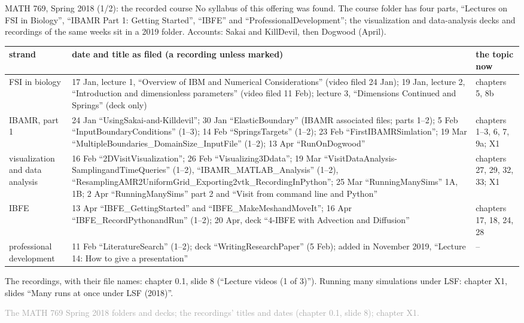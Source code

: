 \documentclass[aspectratio=169,11pt]{beamer}
\newcommand{\sourcecredit}[1]{\vfill\begin{flushright}\tiny\textcolor{DarkGray}{#1}\end{flushright}}
\begin{document}
\begin{frame}{MATH 769, Spring 2018 (1/2): the recorded course}
\label{fr:m769e}
\footnotesize No syllabus of this offering was found. The course folder has four parts, ``Lectures on FSI in Biology'', ``IBAMR Part 1: Getting Started'', ``IBFE'' and ``ProfessionalDevelopment''; the visualization and data-analysis decks and recordings of the same weeks sit in a 2019 folder. Accounts: Sakai and KillDevil, then Dogwood (April).

\vspace{1mm}
\tiny
\renewcommand{\arraystretch}{1.12}
\setlength{\tabcolsep}{3pt}
\begin{tabular}{@{}L{0.14\textwidth}L{0.66\textwidth}L{0.15\textwidth}@{}}
\toprule
strand & date and title as filed (a recording unless marked) & the topic now \\
\midrule
FSI in biology & 17 Jan, lecture 1, ``Overview of IBM and Numerical Considerations'' (video filed 24 Jan); 19 Jan, lecture 2, ``Introduction and dimensionless parameters'' (video filed 11 Feb); lecture 3, ``Dimensions Continued and Springs'' (deck only) & chapters 5, 8b \\
IBAMR, part 1 & 24 Jan ``UsingSakai-and-Killdevil''; 30 Jan ``ElasticBoundary'' (IBAMR associated files; parts 1--2); 5 Feb ``InputBoundaryConditions'' (1--3); 14 Feb ``SpringsTargets'' (1--2); 23 Feb ``FirstIBAMRSimlation''; 19 Mar ``MultipleBoundaries\_\allowbreak DomainSize\_\allowbreak InputFile'' (1--2); 13 Apr ``RunOnDogwood'' & chapters 1--3, 6, 7, 9a; X1 \\
visualization and data analysis & 16 Feb ``2DVisitVisualization''; 26 Feb ``Visualizing3Ddata''; 19 Mar ``VisitDataAnalysis-\allowbreak SamplingandTimeQueries'' (1--2), ``IBAMR\_\allowbreak MATLAB\_\allowbreak Analysis'' (1--2), ``ResamplingAMR2UniformGrid\_\allowbreak Exporting2vtk\_\allowbreak RecordingInPython''; 25 Mar ``RunningManySims'' 1A, 1B; 2 Apr ``RunningManySims'' part 2 and ``Visit from command line and Python'' & chapters 27, 29, 32, 33; X1 \\
IBFE & 13 Apr ``IBFE\_\allowbreak GettingStarted'' and ``IBFE\_\allowbreak MakeMeshandMoveIt''; 16 Apr ``IBFE\_\allowbreak RecordPythonandRun'' (1--2); 20 Apr, deck ``4-IBFE with Advection and Diffusion'' & chapters 17, 18, 24, 28 \\
professional development & 11 Feb ``LiteratureSearch'' (1--2); deck ``WritingResearchPaper'' (5 Feb); added in November 2019, ``Lecture 14: How to give a presentation'' & -- \\
\bottomrule
\end{tabular}

\vspace{2mm}
\footnotesize The recordings, with their file names: chapter 0.1, slide 8 (``Lecture videos (1 of 3)''). Running many simulations under LSF: chapter X1, slides ``Many runs at once under LSF (2018)''.
\sourcecredit{The MATH 769 Spring 2018 folders and decks; the recordings' titles and dates (chapter 0.1, slide 8); chapter X1.}
\end{frame}
\end{document}
